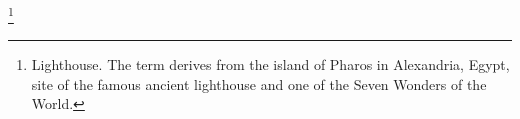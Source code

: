 \footnote{Lighthouse. The term derives from the island of Pharos in Alexandria, Egypt, site of the famous ancient lighthouse and one of the Seven Wonders of the World.}
